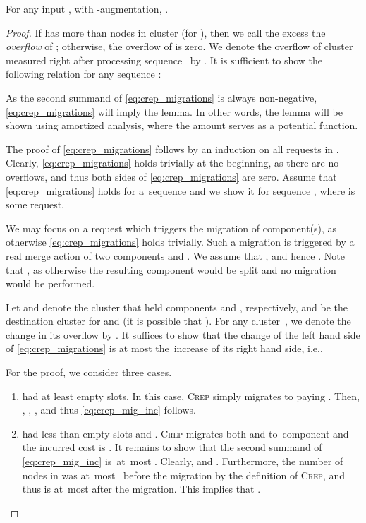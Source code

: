 \documentclass{siamart190516}
\newcommand{\CREP}{\textsc{Crep}\xspace}
\begin{document}
\begin{lemma}
\label{lem:crep_mig}
For any input , with -augmentation, 
.
\end{lemma}

\begin{proof}
If  has more than  nodes in cluster  (for ), then we call the excess  the \emph{overflow} of ;
otherwise, the overflow of  is zero. We denote the overflow of cluster
 measured right after processing sequence~ by .
It is sufficient to show the following relation for any sequence :

As the second summand of \eqref{eq:crep_migrations} is always non-negative,
\eqref{eq:crep_migrations} will imply the lemma. 
In other words, the lemma will be shown using amortized analysis, where
the amount  serves 
as a potential function.

The proof of \eqref{eq:crep_migrations} follows by an induction on all
requests in . Clearly, \eqref{eq:crep_migrations} holds trivially at the
beginning, as there are no overflows, and thus both sides of
\eqref{eq:crep_migrations} are zero. Assume that \eqref{eq:crep_migrations}
holds for a~sequence  and we show it for sequence ,
where  is some request.

We may focus on a request  which triggers the migration of
component(s), as otherwise
\eqref{eq:crep_migrations} holds trivially. Such a migration is triggered by a
real merge action  of two components  and . We assume that , and hence . Note that ,
as otherwise the resulting component would be split and no migration would
be performed.

Let  and  denote the cluster that held components  and ,
respectively, and  be the destination cluster for  and  (it is
possible that ). For any cluster~, we denote the change in 
its overflow by . 
It suffices to show that the
change of the left hand side of \eqref{eq:crep_migrations} is at most
the~increase of its right hand side, i.e.,

For the proof, we consider three cases.

\begin{enumerate}
\item 
 had at least  empty slots. In this case, \CREP simply migrates
 to  paying . Then, ,
, , and thus \eqref{eq:crep_mig_inc}
follows.

\item 
 had less than  empty slots and .
\CREP migrates both  and  to~component  and the incurred cost is 
. 
It remains to show that the second summand of \eqref{eq:crep_mig_inc} is~at~most . 
Clearly,  and . 
Furthermore, the number of 
nodes in  was at~most~ before the migration by the definition of \CREP,
and thus is at~most  after the migration.
This implies that .


\end{enumerate}
\end{proof}
\end{document}

